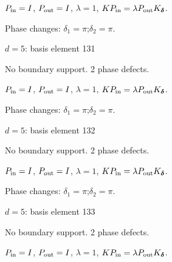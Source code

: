 \vspace{-1mm}
$P_{\rm in}=I$, \quad $P_{\rm out}=I$, \quad $\lambda=1$, \qquad $K P_{\rm in}=\lambda P_{\rm out}K_{\boldsymbol\delta}$.
\par\smallskip\begin{minipage}{.98\linewidth}\small Phase changes: $\delta_{1}=\pi$;\quad $\delta_{2}=\pi$.\end{minipage}
\vfill
{\footnotesize\texttt{}}
\newpage
{}
{\Large $d=5$: basis element 131}\par
No boundary support. 2 phase defects.
\begin{center}
\end{center}
\vspace{-1mm}
$P_{\rm in}=I$, \quad $P_{\rm out}=I$, \quad $\lambda=1$, \qquad $K P_{\rm in}=\lambda P_{\rm out}K_{\boldsymbol\delta}$.
\par\smallskip\begin{minipage}{.98\linewidth}\small Phase changes: $\delta_{1}=\pi$;\quad $\delta_{2}=\pi$.\end{minipage}
\vfill
{\footnotesize\texttt{}}
\newpage
{}
{\Large $d=5$: basis element 132}\par
No boundary support. 2 phase defects.
\begin{center}
\end{center}
\vspace{-1mm}
$P_{\rm in}=I$, \quad $P_{\rm out}=I$, \quad $\lambda=1$, \qquad $K P_{\rm in}=\lambda P_{\rm out}K_{\boldsymbol\delta}$.
\par\smallskip\begin{minipage}{.98\linewidth}\small Phase changes: $\delta_{1}=\pi$;\quad $\delta_{2}=\pi$.\end{minipage}
\vfill
{\footnotesize\texttt{}}
\newpage
{}
{\Large $d=5$: basis element 133}\par
No boundary support. 2 phase defects.
\begin{center}
\end{center}
\vspace{-1mm}
$P_{\rm in}=I$, \quad $P_{\rm out}=I$, \quad $\lambda=1$, \qquad $K P_{\rm in}=\lambda P_{\rm out}K_{\boldsymbol\delta}$.
